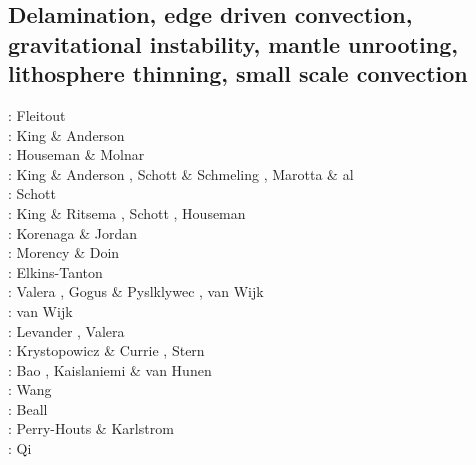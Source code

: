 \subsection{Delamination, edge driven convection, gravitational instability, mantle unrooting, lithosphere thinning, small scale convection} 

\begin{scriptsize}
\nineteeneightysix: Fleitout \etal \cite{flfy86}\\
\nineteenninetyfive: King \& Anderson \cite{kian95}\\
\nineteenninetyseven: Houseman \& Molnar \cite{homo97}\\
\nineteenninetyeight: King \& Anderson \cite{kian98}, Schott \& Schmeling \cite{scsc98}, 
                      Marotta \& al \cite{mafs98}\\
\nineteenninetynine: Schott \etal \cite{scys99} \\
\twothousand: King \& Ritsema \cite{kiri00}, Schott \etal \cite{scys00}, Houseman \etal \cite{honk00}\\
\twothousandthree: Korenaga \& Jordan \cite{kojo03} \\
\twothousandfour: Morency \& Doin \cite{modo04}\\
\twothousandseven: Elkins-Tanton \cite{elki07}\\
\twothousandeight: Valera \etal \cite{vanv08}, Gogus \& Pyslklywec \cite{gopy08}, 
                   van Wijk \etal \cite{vavg08}\\
\twothousandten: van Wijk \etal \cite{vabv10}\\
\twothousandeleven: Levander \etal \cite{lesm11}, Valera \etal \cite{vanj11}\\
\twothousandthirteen: Krystopowicz \& Currie \cite{krcu13}, Stern \etal \cite{sths13}\\
\twothousandfourteen: Bao \etal \cite{baeg14}, Kaislaniemi \& van Hunen \cite{kava14}\\
\twothousandfifteen: Wang \etal \cite{wahz15}\\
\twothousandseventeen: Beall \etal \cite{bems17}\\
\twothousandeighteen: Perry-Houts \& Karlstrom \cite{peka18}\\
\twothousandtwentyone: Qi \etal \cite{qizx21}
\end{scriptsize}



